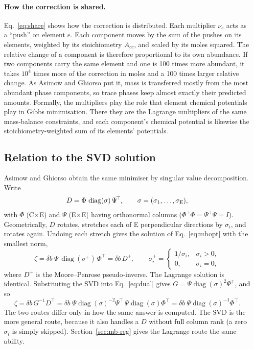 \documentclass[11pt]{article}
\begin{document}
\paragraph{How the correction is shared.} Eq.~\eqref{eq:share} shows how the correction is
distributed. Each multiplier $\nu_e$ acts as a ``push'' on element $e$. Each component moves
by the sum of the pushes on its elements, weighted by its stoichiometry $A_{ce}$, and scaled
by its moles squared. The relative change of a component is therefore proportional to its
own abundance. If two components carry the same element and one is 100 times more abundant,
it takes $10^4$ times more of the correction in moles and a 100 times larger relative
change. As Asimow and Ghiorso put it, mass is transferred mostly from the most abundant
phase components, so trace phases keep almost exactly their predicted amounts. Formally,
the multipliers play the role that element chemical potentials play in Gibbs minimisation.
There they are the Lagrange multipliers of the same mass-balance constraints, and each
component's chemical potential is likewise the stoichiometry-weighted sum of its elements'
potentials.

\subsection{Relation to the SVD solution}
\label{sec:mb-svd}

Asimow and Ghiorso obtain the same minimiser by singular value decomposition. Write
\begin{equation}
  D = \Phi\,\operatorname{diag}(\sigma)\,\Psi^{\!\top},
  \qquad \sigma = (\sigma_1, \dots, \sigma_{\rm E}),
\end{equation}
with $\Phi$ (C$\times$E) and $\Psi$ (E$\times$E) having orthonormal columns
($\Phi^{\!\top}\Phi = \Psi^{\!\top}\Psi = I$). Geometrically, $D$ rotates, stretches each of E
perpendicular directions by $\sigma_i$, and rotates again. Undoing each stretch gives the
solution of Eq.~\eqref{eq:mbopt} with the smallest norm,
\begin{equation}
  \zeta = \delta b\; \Psi\,\operatorname{diag}(\sigma^{+})\,\Phi^{\!\top} = \delta b\, D^{+},
  \qquad \sigma_i^{+} = \begin{cases} 1/\sigma_i, & \sigma_i > 0,\\ 0, & \sigma_i = 0, \end{cases}
  \label{eq:agsvd}
\end{equation}
where $D^{+}$ is the Moore--Penrose pseudo-inverse. The Lagrange solution is identical.
Substituting the SVD into Eq.~\eqref{eq:dual} gives
$G = \Psi\operatorname{diag}(\sigma)^2\Psi^{\!\top}$, and so
\begin{equation}
  \zeta = \delta b\, G^{-1} D^{\!\top}
    = \delta b\; \Psi\operatorname{diag}(\sigma)^{-2}\Psi^{\!\top}\,
      \Psi\operatorname{diag}(\sigma)\Phi^{\!\top}
    = \delta b\; \Psi\operatorname{diag}(\sigma)^{-1}\Phi^{\!\top}.
\end{equation}
The two routes differ only in how the same answer is computed. The SVD is the more general
route, because it also handles a $D$ without full column rank (a zero $\sigma_i$ is simply
skipped). Section~\ref{sec:mb-reg} gives the Lagrange route the same ability.
\end{document}

